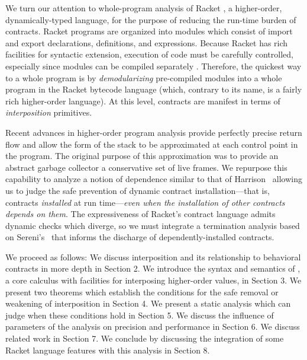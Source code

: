 We turn our attention to whole-program analysis of Racket \cite{plt-tr1}, a higher-order, dynamically-typed language, for the purpose of reducing the run-time burden of contracts.
Racket programs are organized into modules which consist of import and export declarations, definitions, and expressions.
Because Racket has rich facilities for syntactic extension, execution of code must be carefully controlled, especially since modules can be compiled separately \cite{flatt2002composable}.
Therefore, the quickest way to a whole program is by \emph{demodularizing} pre-compiled modules into a whole program in the Racket bytecode language (which, contrary to its name, is a fairly rich higher-order language).
At this level, contracts are manifest in terms of \emph{interposition} primitives.

Recent advances in higher-order program analysis \cite{earl2012introspective} provide perfectly precise return flow and allow the form of the stack to be approximated at each control point in the program.
The original purpose of this approximation was to provide an abstract garbage collector a conservative set of live frames.
We repurpose this capability to analyze a notion of dependence similar to that of Harrison~\cite{harrison1989interprocedural} allowing us to judge the safe prevention of dynamic contract installation---that is, contracts \emph{installed} at run time---\emph{even when the installation of other contracts depends on them}.
The expressiveness of Racket's contract language admits dynamic checks which diverge, so we must integrate a termination analysis based on Sereni's~\cite{sereni2007termination} that informs the discharge of dependently-installed contracts.

We proceed as follows:
We discuss interposition and its relationship to behavioral contracts in more depth in Section 2.
We introduce the syntax and semantics of \chapcalc, a core calculus with facilities for interposing higher-order values, in Section 3.
We present two theorems which establish the conditions for the safe removal or weakening of interposition in Section 4.
We present a static analysis which can judge when these conditions hold in Section 5.
We discuss the influence of parameters of the analysis on precision and performance in Section 6.
We discuss related work in Section 7.
We conclude by discussing the integration of some Racket language features with this analysis in Section 8.
